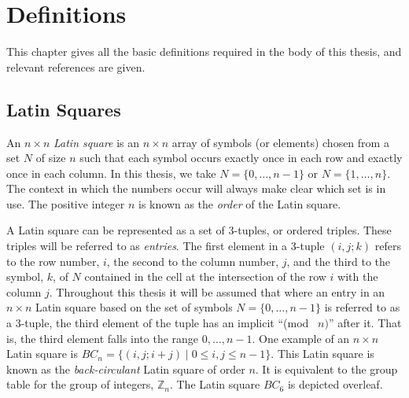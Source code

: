 \documentclass[12pt]{report}
\begin{document}
\else
  \newenvironment{latinsq}[2][0]{%
    \settowidth{\lsq@cell}{#1}%
    \advance\lsq@cell by 1.1em
    \ifdim\lsq@cell<1.8em \lsq@cell 1.8em\fi
    \setlength{\tabcolsep}{0pt}%
    \def\lsq@strut{\rule[-0.3\lsq@cell]{0pt}{\lsq@cell}}%
    \begin{tabular}{|*{#2}{>{\lsq@strut\centering\arraybackslash}p{\lsq@cell}|}}%
  }{\end{tabular}}
\fi
\makeatother

\chapter{Definitions}\label{ch2}
This chapter gives all the basic definitions required in the body of this
thesis, and relevant references are given.

\section{Latin Squares}
An $n \times n$ {\it Latin square} is an $n \times n$ array of symbols
(or elements) chosen from a set $N$ of size $n$ such that each symbol
occurs exactly once in each row and exactly once in each column.  In this thesis,
we take $N =\{ 0, \dots, n-1 \}$ or $N = \{ 1, \dots, n \}$.   The context
in which the numbers occur will always make clear which set is in use.
The positive integer $n$ is known as the {\it order} of the Latin square.

A Latin square can be represented as a set of 3-tuples, or ordered
triples.  These triples will be referred to as {\it entries}.
The first element in a 3-tuple $(i,j;k)$ refers to the row number, $i$, the second to
the column number, $j$, and the third to the symbol, $k$, of $N$ contained
in the cell at the intersection of the row $i$ with the column $j$.  Throughout this thesis
it will be assumed that where an entry in an $n \times n$ Latin square
based on the set of symbols $N = \{ 0, \dots, n-1 \}$
is referred to as a 3-tuple, 
the third element of the tuple has an implicit ``(mod~
$n)$'' after it.  That is, the third element 
falls into the range $0, \dots, n-1$.  One example of an $n \times n$ Latin square is $BC_n =
\{ (i, j; i + j ) \mid 0 \leq i,j \leq n-1 \}$.  This Latin
square is known as the {\it back-circulant} Latin square of order $n$.
It is equivalent to the group table for the group of integers, ${\mathbb Z}_n$.
The Latin square $BC_6$ is depicted overleaf.
\end{document}
